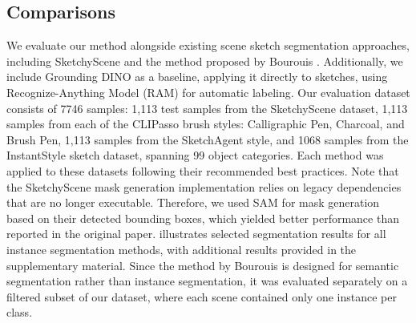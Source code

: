 \subsection{Comparisons}
We evaluate our method alongside existing scene sketch segmentation approaches, including SketchyScene \cite{Zou18SketchyScene} and the method proposed by Bourouis \etal {}. Additionally, we include Grounding DINO \cite{liu2023grounding} as a baseline, applying it directly to sketches, using Recognize-Anything Model (RAM) \cite{zhang2023recognize} for automatic labeling.
Our evaluation dataset consists of 7746 samples: 1,113 test samples from the SketchyScene dataset, 1,113 samples from each of the CLIPasso brush styles: Calligraphic Pen, Charcoal, and Brush Pen, 1,113 samples from the SketchAgent style, and 1068 samples from the InstantStyle sketch dataset, spanning 99 object categories.
Each method was applied to these datasets following their recommended best practices. Note that the SketchyScene mask generation implementation relies on legacy dependencies that are no longer executable. Therefore, we used SAM for mask generation based on their detected bounding boxes, which yielded better performance than reported in the original paper.  illustrates selected segmentation results for all instance segmentation methods, with additional results provided in the supplementary material. Since the method by Bourouis \etal {} is designed for semantic segmentation rather than instance segmentation, it was evaluated separately on a filtered subset of our dataset, where each scene contained only one instance per class. 

